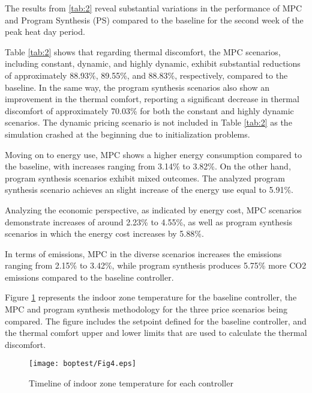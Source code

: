  The results from \ref{tab:2} reveal substantial variations in the performance of MPC and Program Synthesis (PS) compared to the baseline for the second week of the peak heat day period.

Table \ref{tab:2} shows that regarding thermal discomfort, the MPC scenarios, including constant, dynamic, and highly dynamic, exhibit substantial reductions of approximately 88.93\%, 89.55\%, and 88.83\%, respectively, compared to the baseline. In the same way, the program synthesis scenarios also show an improvement in the thermal comfort, reporting a significant decrease in thermal discomfort of approximately 70.03\% for both the constant and highly dynamic scenarios. The dynamic pricing scenario is not included in Table \ref{tab:2} as the simulation crashed at the beginning due to initialization problems.

Moving on to energy use, MPC shows a higher energy consumption compared to the baseline, with increases ranging from 3.14\% to 3.82\%. On the other hand, program synthesis scenarios exhibit mixed outcomes. The analyzed program synthesis scenario achieves an slight increase of the energy use equal to 5.91\%.

Analyzing the economic perspective, as indicated by energy cost, MPC scenarios demonstrate increases of around 2.23\% to 4.55\%, as well as program synthesis scenarios in which the energy cost increases by 5.88\%. 

In terms of emissions, MPC in the diverse scenarios increases the emissions ranging from 2.15\% to 3.42\%, while program synthesis produces 5.75\% more CO2 emissions compared to the baseline controller.

Figure \ref{fig:4} represents the indoor zone temperature for the baseline controller, the MPC and program synthesis methodology for the three price scenarios being compared. The figure includes the setpoint defined for the baseline controller, and the thermal comfort upper and lower limits that are used to calculate the thermal discomfort.

\begin{figure}
  \texttt{[image: boptest/Fig4.eps]}
\caption{Timeline of indoor zone temperature for each controller}
\label{fig:4}       %
\end{figure}
%

